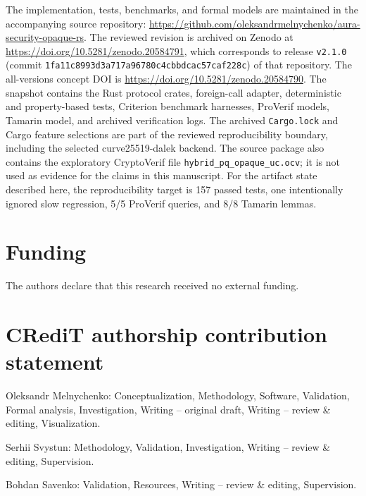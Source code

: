 \documentclass{ieeeijc}
\newcommand{\codeid}[1]{\textsf{#1}}
\theoremstyle{remark}
\begin{document}
The implementation, tests, benchmarks, and formal models are maintained
in the accompanying source repository:
\url{https://github.com/oleksandrmelnychenko/aura-security-opaque-rs}.
The reviewed revision is archived on Zenodo at
\url{https://doi.org/10.5281/zenodo.20584791}, which corresponds to release
\texttt{v2.1.0} (commit \texttt{1fa11c8993d3a\allowbreak{}717a96780c4cb\allowbreak{}bdcac57caf228c}) of that repository. The all-versions
concept DOI is \url{https://doi.org/10.5281/zenodo.20584790}. The snapshot contains the Rust
protocol crates, foreign-call adapter, deterministic and
property-based tests, Criterion benchmark harnesses, ProVerif models,
Tamarin model, and archived verification logs. The archived
\texttt{Cargo.lock} and Cargo feature selections are part of the reviewed
reproducibility boundary, including the selected \codeid{curve25519-dalek}
backend. The source package also contains the exploratory CryptoVerif file
\texttt{hybrid\_pq\_opaque\_uc.ocv}; it is not used as evidence for the
claims in this manuscript. For the artifact state described here, the
reproducibility target is 157 passed tests, one intentionally ignored slow
regression, 5/5 ProVerif queries, and 8/8 Tamarin lemmas.

\section*{Funding}

The authors declare that this research received no external funding.

\section*{CRediT authorship contribution statement}

Oleksandr Melnychenko: Conceptualization, Methodology, Software,
Validation, Formal analysis, Investigation, Writing -- original draft,
Writing -- review \& editing, Visualization.

Serhii Svystun: Methodology, Validation, Investigation, Writing -- review \& editing, Supervision.

Bohdan Savenko: Validation, Resources, Writing -- review \& editing, Supervision.

\end{document}

